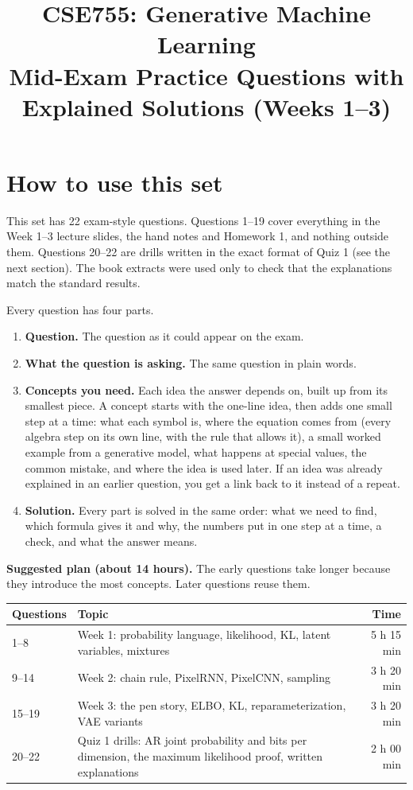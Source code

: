 \documentclass[12pt,a4paper]{article}
\title{CSE755: Generative Machine Learning\\[4pt]\large Mid-Exam Practice Questions with Explained Solutions (Weeks 1--3)}
\author{}
\date{}
\begin{document}
\maketitle
\tableofcontents
\newpage

\section{How to use this set}

This set has 22 exam-style questions. Questions 1--19 cover everything in the Week 1--3 lecture slides, the hand notes and Homework 1, and nothing outside them. Questions 20--22 are drills written in the exact format of Quiz 1 (see the next section). The book extracts were used only to check that the explanations match the standard results.

Every question has four parts.

\begin{enumerate}[nosep]
  \item \textbf{Question.} The question as it could appear on the exam.
  \item \textbf{What the question is asking.} The same question in plain words.
  \item \textbf{Concepts you need.} Each idea the answer depends on, built up from its smallest piece. A concept starts with the one-line idea, then adds one small step at a time: what each symbol is, where the equation comes from (every algebra step on its own line, with the rule that allows it), a small worked example from a generative model, what happens at special values, the common mistake, and where the idea is used later. If an idea was already explained in an earlier question, you get a link back to it instead of a repeat.
  \item \textbf{Solution.} Every part is solved in the same order: what we need to find, which formula gives it and why, the numbers put in one step at a time, a check, and what the answer means.
\end{enumerate}

\textbf{Suggested plan (about 14 hours).} The early questions take longer because they introduce the most concepts. Later questions reuse them.

\begin{center}
\begin{tabular}{@{}l>{\raggedright\arraybackslash}p{}r@{}}
\toprule
Questions & Topic & Time \\
\midrule
1--8 & Week 1: probability language, likelihood, KL, latent variables, mixtures & 5 h 15 min \\
9--14 & Week 2: chain rule, PixelRNN, PixelCNN, sampling & 3 h 20 min \\
15--19 & Week 3: the pen story, ELBO, KL, reparameterization, VAE variants & 3 h 20 min \\
20--22 & Quiz 1 drills: AR joint probability and bits per dimension, the maximum likelihood proof, written explanations & 2 h 00 min \\
\bottomrule
\end{tabular}
\end{center}
\end{document}
